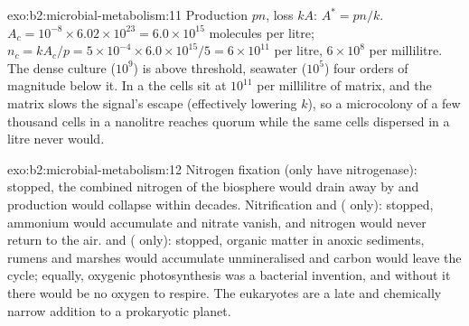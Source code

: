 \begin{solution}{exo:b2:microbial-metabolism:11}
Production $pn$, loss $kA$: $A^* = pn/k$. $A_c = 10^{-8}\times
6.02\times 10^{23} = 6.0\times 10^{15}$ molecules per litre; $n_c =
kA_c/p = 5\times 10^{-4}\times 6.0\times 10^{15}/5 = 6\times 10^{11}$
per litre, $6\times 10^{8}$ per millilitre. The dense culture
($10^{9}$) is above threshold, seawater ($10^{5}$) four orders of
magnitude below it. In a  the cells sit at $10^{11}$ per
millilitre of matrix, and the matrix slows the signal's escape
(effectively lowering $k$), so a microcolony of a few thousand cells
in a nanolitre reaches quorum while the same cells dispersed in a
litre never would.
\end{solution}

\begin{solution}{exo:b2:microbial-metabolism:12}
Nitrogen fixation (only  have nitrogenase): stopped, the
combined nitrogen of the biosphere would drain away by
 and production would collapse within decades.
Nitrification and  ( only): stopped,
ammonium would accumulate and nitrate vanish, and nitrogen would
never return to the air.  and 
( only): stopped, organic matter in anoxic sediments,
rumens and marshes would accumulate unmineralised and carbon would
leave the cycle; equally, oxygenic photosynthesis was a bacterial
invention, and without it there would be no oxygen to respire. The
eukaryotes are a late and chemically narrow addition to a
prokaryotic planet.
\end{solution}

